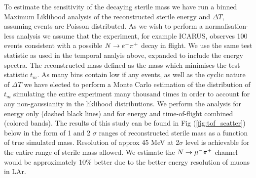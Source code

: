 \documentclass[11pt, a4paper]{article}
\def\ster{\ensuremath N}
\begin{document}
To estimate the sensitivity of the decaying sterile mass we have run a binned
Maximum Liklihood analysis of the reconstructed sterile energy and $\Delta T$,
assuming events are Poisson distributed. As we wish to perform a
normalisation-less analysis we assume that the experiment, for example ICARUS,
observes 100 events consistent with a possible $\ster\rightarrow e^- \pi^+$
decay in flight. We use the same test statistic as used in the temporal analyis
above, expanded to include the energy spectra. The reconstructed mass defined
as the mass which minimises the test statistic $t_m$. As many bins contain low
if any events, as well as the cyclic nature of $\Delta T$ we have elected to
perform a Monte Carlo estimation of the distribution of $t_m$ simulating the
entire experiment many thousand times in order to account for any
non-gaussianity in the liklihood distributions. We perform the analysis for
energy only (dashed black lines) and for energy and time-of-flight combined
(colored bands). The results of this study can be found in Fig
(\ref{fig:tof_scatter}) below in the form of 1 and 2 $\sigma$ ranges of
reconstructed sterile mass as a function of true simulated mass. Resolution of
approx 45 MeV at 2$\sigma$ level is achievable for the entire range of sterile
mass allowed. We estimate the $\ster\rightarrow \mu^- \pi^+$ channel would be
approximately 10\% better due to the better energy resolution of muons in LAr.  
\end{document}
